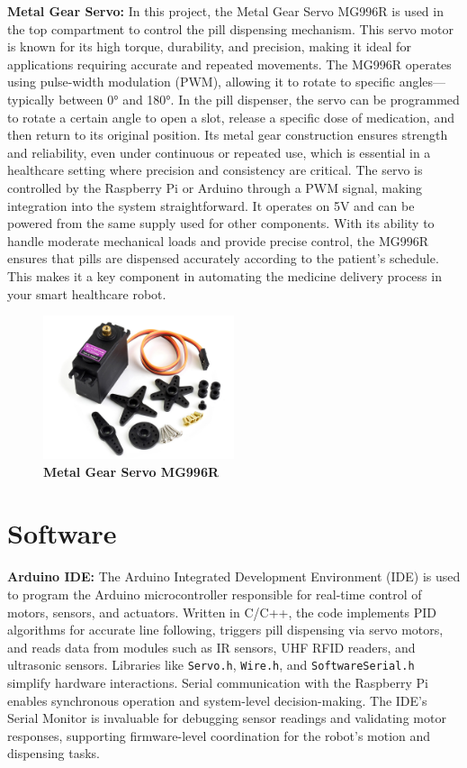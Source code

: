 \textbf{Metal Gear Servo: }In this project, the Metal Gear Servo MG996R is used in the top compartment to control the pill dispensing mechanism. This servo motor is known for its high torque, durability, and precision, making it ideal for applications requiring accurate and repeated movements. The MG996R operates using pulse-width modulation (PWM), allowing it to rotate to specific angles—typically between 0° and 180°. In the pill dispenser, the servo can be programmed to rotate a certain angle to open a slot, release a specific dose of medication, and then return to its original position. Its metal gear construction ensures strength and reliability, even under continuous or repeated use, which is essential in a healthcare setting where precision and consistency are critical. The servo is controlled by the Raspberry Pi or Arduino through a PWM signal, making integration into the system straightforward. It operates on 5V and can be powered from the same supply used for other components. With its ability to handle moderate mechanical loads and provide precise control, the MG996R ensures that pills are dispensed accurately according to the patient’s schedule. This makes it a key component in automating the medicine delivery process in your smart healthcare robot.

\begin{figure}[htbp!]
\centering
\includegraphics[width=0.5\textwidth]{images/3.5.jpg}
\caption{\textbf{Metal Gear Servo MG996R}}
\label{fig:3.5}
\end{figure}

\section{Software}

\textbf{Arduino IDE:} The Arduino Integrated Development Environment (IDE) is used to program the Arduino microcontroller responsible for real-time control of motors, sensors, and actuators. Written in C/C++, the code implements PID algorithms for accurate line following, triggers pill dispensing via servo motors, and reads data from modules such as IR sensors, UHF RFID readers, and ultrasonic sensors. Libraries like \texttt{Servo.h}, \texttt{Wire.h}, and \texttt{SoftwareSerial.h} simplify hardware interactions. Serial communication with the Raspberry Pi enables synchronous operation and system-level decision-making. The IDE’s Serial Monitor is invaluable for debugging sensor readings and validating motor responses, supporting firmware-level coordination for the robot’s motion and dispensing tasks.


